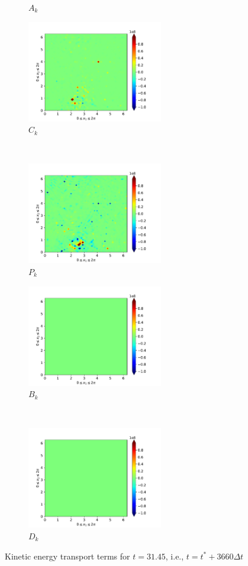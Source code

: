 \begin{figure}[H]
\begin{subfigure}{0.45\textwidth}
        \caption{$A_{k}$}
    \end{subfigure}
    \newline
    \begin{subfigure}{0.45\textwidth}
        \includegraphics[height=1.75in]{media/run-cds-65-5k/C-ke-4750.png}
        \caption{$C_{k}$}
    \end{subfigure}
    ~
    \begin{subfigure}{0.45\textwidth}
        \includegraphics[height=1.75in]{media/run-cds-65-5k/P-ke-4750.png}
        \caption{$P_{k}$}
    \end{subfigure}
    \newline
    \begin{subfigure}{0.45\textwidth}
        \includegraphics[height=1.75in]{media/run-cds-65-5k/B-ke-4750.png}
        \caption{$B_{k}$}
    \end{subfigure}
    ~
    \begin{subfigure}{0.45\textwidth}
        \includegraphics[height=1.75in]{media/run-cds-65-5k/D-ke-4750.png}
        \caption{$D_{k}$}
    \end{subfigure}
    \caption{Kinetic energy transport terms for $t=31.45$, i.e., $t=t^{\ast} + 3660 \Delta t$}
    \label{fig:ke-4750}
\end{figure}
